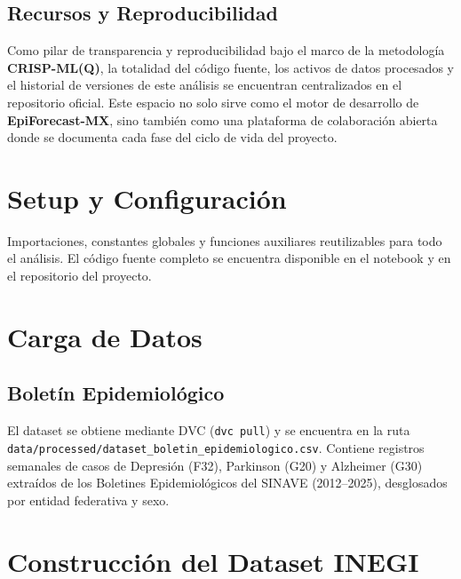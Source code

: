 \documentclass[12pt,letterpaper]{article}
\newcommand{\code}[1]{\texttt{\small #1}}
\begin{document}
\subsection*{Recursos y Reproducibilidad}

Como pilar de transparencia y reproducibilidad bajo el marco de la metodología \textbf{CRISP-ML(Q)}, la totalidad del código fuente, los activos de datos procesados y el historial de versiones de este análisis se encuentran centralizados en el repositorio oficial. Este espacio no solo sirve como el motor de desarrollo de \textbf{EpiForecast-MX}, sino también como una plataforma de colaboración abierta donde se documenta cada fase del ciclo de vida del proyecto.

\newpage

\section{Setup y Configuración}

Importaciones, constantes globales y funciones auxiliares reutilizables para todo el análisis. El código fuente completo se encuentra disponible en el notebook y en el repositorio del proyecto.

\section{Carga de Datos}

\subsection{Boletín Epidemiológico}

El dataset se obtiene mediante DVC (\code{dvc pull}) y se encuentra en la ruta \code{data/\allowbreak processed/\allowbreak dataset\_boletin\_\allowbreak epidemiologico.csv}. Contiene registros semanales de casos de Depresión (F32), Parkinson (G20) y Alzheimer (G30) extraídos de los Boletines Epidemiológicos del SINAVE (2012--2025), desglosados por entidad federativa y sexo.

\section{Construcción del Dataset INEGI}
\end{document}
